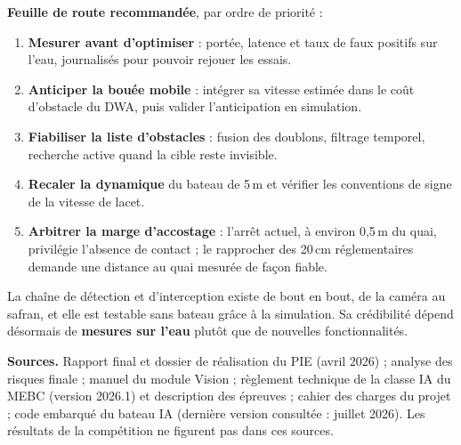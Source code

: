 \documentclass[11pt,letterpaper]{article}
\begin{document}
\noindent\textbf{Feuille de route recommandée}, par ordre de priorité :
\begin{enumerate}
    \item \textbf{Mesurer avant d'optimiser} : portée, latence et taux de
    faux positifs sur l'eau, journalisés pour pouvoir rejouer les essais.
    \item \textbf{Anticiper la bouée mobile} : intégrer sa vitesse estimée dans
    le coût d'obstacle du DWA, puis valider l'anticipation en simulation.
    \item \textbf{Fiabiliser la liste d'obstacles} : fusion des doublons,
    filtrage temporel, recherche active quand la cible reste invisible.
    \item \textbf{Recaler la dynamique} du bateau de 5\,m et vérifier les
    conventions de signe de la vitesse de lacet.
    \item \textbf{Arbitrer la marge d'accostage} : l'arrêt actuel, à environ
    0,5\,m du quai, privilégie l'absence de contact ; le rapprocher des
    20\,cm réglementaires demande une distance au quai mesurée de façon fiable.
\end{enumerate}

\begin{tameoBox}
La chaîne de détection et d'interception existe de bout en bout, de la caméra
au safran, et elle est testable sans bateau grâce à la simulation. Sa
crédibilité dépend désormais de \textbf{mesures sur l'eau} plutôt que de
nouvelles fonctionnalités.
\end{tameoBox}

\vfill
{\scriptsize\color{tameoText}\noindent\textbf{Sources.} Rapport final et
dossier de réalisation du PIE (avril 2026) ; analyse des risques finale ;
manuel du module Vision ; règlement technique de la classe IA du MEBC
(version 2026.1) et description des épreuves ; cahier des charges du projet ;
code embarqué du bateau IA (dernière version consultée : juillet 2026). Les
résultats de la compétition ne figurent pas dans ces sources.\par}
\end{document}
